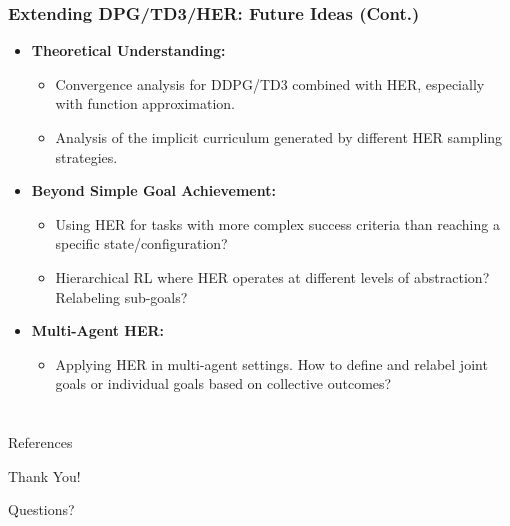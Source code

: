\documentclass[9pt, aspectratio=169]{beamer}
\newcommand{\pageauthor}{}
\begin{document}
\begin{frame}
  \frametitle{Extending DPG/TD3/HER: Future Ideas (Cont.)}

    \begin{itemize}
         \item \textbf{Theoretical Understanding:}
            \begin{itemize}
                \item Convergence analysis for DDPG/TD3 combined with HER, especially with function approximation.
                \item Analysis of the implicit curriculum generated by different HER sampling strategies.
            \end{itemize}

        \item \textbf{Beyond Simple Goal Achievement:}
            \begin{itemize}
                 \item Using HER for tasks with more complex success criteria than reaching a specific state/configuration?
                 \item Hierarchical RL where HER operates at different levels of abstraction? Relabeling sub-goals?
            \end{itemize}

        \item \textbf{Multi-Agent HER:}
             \begin{itemize}
                \item Applying HER in multi-agent settings. How to define and relabel joint goals or individual goals based on collective outcomes?
             \end{itemize}
    \end{itemize}
\end{frame}


\section{}
\renewcommand{\pageauthor}{}
\begin{frame}{References}
   \printbibliography[heading=none]
\end{frame}

\begin{frame}
    \centering
    \Huge Thank You!

    \vspace{1cm}
    \normalsize Questions?
\end{frame}
\end{document}
